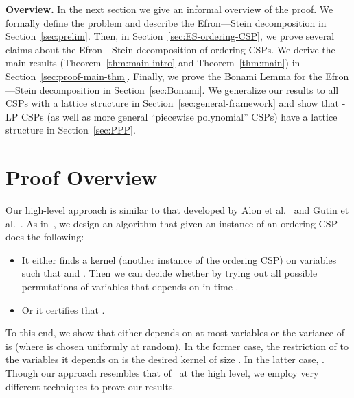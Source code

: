 \documentclass[11pt]{article}
\begin{document}
\noindent \textbf{Overview.} In the next section we give an informal overview of the proof.
We formally define the problem and describe the Efron---Stein decomposition in Section~\ref{sec:prelim}.
Then, in Section~\ref{sec:ES-ordering-CSP}, we prove several claims about the Efron---Stein decomposition
of ordering CSPs. We derive the main results (Theorem~\ref{thm:main-intro} and Theorem~\ref{thm:main}) in
Section~\ref{sec:proof-main-thm}. Finally, we prove the Bonami Lemma for the Efron---Stein decomposition
in Section~\ref{sec:Bonami}. We generalize our results to all CSPs with a lattice structure in Section~\ref{sec:general-framework}
and show that -LP CSPs (as well as more general ``piecewise polynomial'' CSPs)
have a lattice structure in Section~\ref{sec:PPP}.


\section{Proof Overview}\label{sec:proof-overview}
Our high-level approach is similar to that developed by Alon et al.~\cite{AGKSY} and Gutin et al.~\cite{GKSY, GKMY, GIMY}.
As in~\cite{GKSY, GKMY, GIMY}, we design an algorithm that given an instance  of an ordering CSP does the following:
\begin{itemize}
\item It either finds a kernel (another instance of the ordering CSP)  on  variables such that  and .
Then we can decide whether  by trying out all possible permutations of variables that  depends on in time .
\item Or it certifies that .
\end{itemize}
To this end, we show that either  depends on at most  variables or the variance of  is  (where  is chosen uniformly at random). In the former case, the restriction of  to the variables it depends on is the desired kernel of size . In the latter case, .
Though our approach resembles that of~\cite{GKSY, GKMY, GIMY} at the high level, we employ very different techniques to prove our results.
\end{document}
